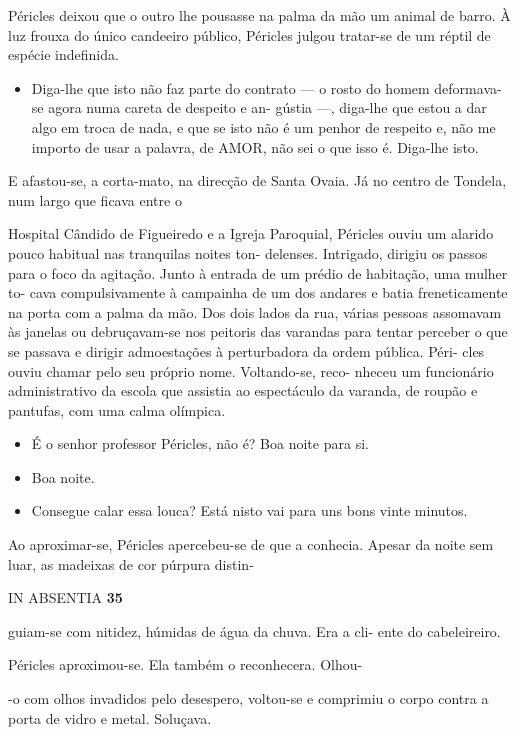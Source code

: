 Péricles deixou que o outro lhe pousasse na palma da mão um animal de
barro. À luz frouxa do único candeeiro público, Péricles julgou
tratar-se de um réptil de espécie indefinida.

\begin{itemize}
\tightlist
\item
  Diga-lhe que isto não faz parte do contrato --- o rosto do homem
  deformava-se agora numa careta de despeito e an- gústia ---, diga-lhe
  que estou a dar algo em troca de nada, e que se isto não é um penhor
  de respeito e, não me importo de usar a palavra, de AMOR, não sei o
  que isso é. Diga-lhe isto.
\end{itemize}

E afastou-se, a corta-mato, na direcção de Santa Ovaia. Já no centro de
Tondela, num largo que ficava entre o

Hospital Cândido de Figueiredo e a Igreja Paroquial, Péricles ouviu um
alarido pouco habitual nas tranquilas noites ton- delenses. Intrigado,
dirigiu os passos para o foco da agitação. Junto à entrada de um prédio
de habitação, uma mulher to- cava compulsivamente à campainha de um dos
andares e batia freneticamente na porta com a palma da mão. Dos dois
lados da rua, várias pessoas assomavam às janelas ou debruçavam-se nos
peitoris das varandas para tentar perceber o que se passava e dirigir
admoestações à perturbadora da ordem pública. Péri- cles ouviu chamar
pelo seu próprio nome. Voltando-se, reco- nheceu um funcionário
administrativo da escola que assistia ao espectáculo da varanda, de
roupão e pantufas, com uma calma olímpica.

\begin{itemize}
\tightlist
\item
  É o senhor professor Péricles, não é? Boa noite para si.
\item
  Boa noite.
\item
  Consegue calar essa louca? Está nisto vai para uns bons vinte minutos.
\end{itemize}

Ao aproximar-se, Péricles apercebeu-se de que a conhecia. Apesar da
noite sem luar, as madeixas de cor púrpura distin-

IN ABSENTIA \textbf{35}

guiam-se com nitidez, húmidas de água da chuva. Era a cli- ente do
cabeleireiro.

Péricles aproximou-se. Ela também o reconhecera. Olhou-

-o com olhos invadidos pelo desespero, voltou-se e comprimiu o corpo
contra a porta de vidro e metal. Soluçava.

